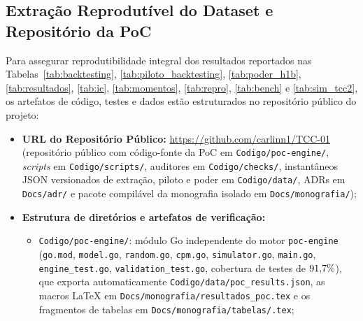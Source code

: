 \documentclass[12pt,openany,oneside,a4paper,english,brazilian,sumario=tradicional]{abntex2}
\begin{document}
\begin{apendicesenv}
\chapter{Extração Reprodutível do Dataset e Repositório da PoC}\label{apd:extracao}

Para assegurar reprodutibilidade integral dos resultados reportados nas Tabelas~\ref{tab:backtesting}, \ref{tab:piloto_backtesting}, \ref{tab:poder_h1b}, \ref{tab:resultados}, \ref{tab:ic}, \ref{tab:momentos}, \ref{tab:repro}, \ref{tab:bench} e \ref{tab:sim_tcc2}, os artefatos de código, testes e dados estão estruturados no repositório público do projeto:

\begin{itemize}
  \item \textbf{URL do Repositório Público:} \url{https://github.com/carlinn1/TCC-01} (repositório público com código-fonte da PoC em \texttt{Codigo/\allowbreak poc-engine/\allowbreak }, \textit{scripts} em \texttt{Codigo/\allowbreak scripts/\allowbreak }, auditores em \texttt{Codigo/\allowbreak checks/\allowbreak }, instantâneos JSON versionados de extração, piloto e poder em \texttt{Codigo/\allowbreak data/\allowbreak }, ADRs em \texttt{Docs/\allowbreak adr/\allowbreak } e pacote compilável da monografia isolado em \texttt{Docs/\allowbreak monografia/\allowbreak });
  \item \textbf{Estrutura de diretórios e artefatos de verificação:}
  \begin{itemize}
    \item \texttt{Codigo/\allowbreak poc-engine/\allowbreak }: módulo Go independente do motor \texttt{poc-engine} (\texttt{go.mod}, \texttt{model.go}, \texttt{random.go}, \texttt{cpm.go}, \texttt{simulator.go}, \texttt{main.go}, \texttt{engine\_\allowbreak test.go}, \texttt{validation\_\allowbreak test.go}, cobertura de testes de $91{,}7{}\%$), que exporta automaticamente \texttt{Codigo/\allowbreak }\allowbreak\texttt{data/\allowbreak }\allowbreak\texttt{poc\_\allowbreak results.json}, as macros LaTeX em \texttt{Docs/\allowbreak }\allowbreak\texttt{monografia/\allowbreak }\allowbreak\texttt{resultados\_\allowbreak poc.tex} e os fragmentos de tabelas em \texttt{Docs/\allowbreak }\allowbreak\texttt{monografia/\allowbreak }\allowbreak\texttt{tabelas/\allowbreak *.tex};

\end{itemize}
\end{itemize}
\end{apendicesenv}
\end{document}
